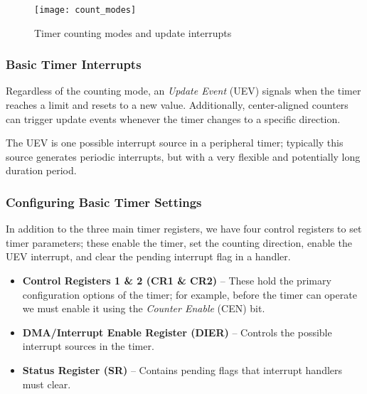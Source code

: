 \documentclass[openany,11pt,fleqn]{book} %
\begin{document}
    \begin{figure}[]
        \centering\texttt{[image: count\_modes]}
        \caption{Timer counting modes and update interrupts}
        \label{count_modes}
    \end{figure}

    \subsubsection{Basic Timer Interrupts}
    
    Regardless of the counting mode, an \textit{Update Event} (UEV) signals when the timer reaches a limit and resets to a new value. Additionally, center-aligned counters can trigger update events whenever the timer changes to a specific direction. 
    
    The UEV is one possible interrupt source in a peripheral timer; typically this source generates periodic interrupts, but with a very flexible and potentially long duration period.
    
    \subsubsection{Configuring Basic Timer Settings}
    In addition to the three main timer registers, we have four control registers to set timer parameters; these enable the timer, set the counting direction, enable the UEV interrupt, and clear the pending interrupt flag in a handler. 
    
    \begin{itemize}
        \item \textbf{Control Registers 1 \& 2 (CR1 \& CR2)} -- These hold the primary configuration options of the timer; for example, before the timer can operate we must enable it using the \textit{Counter Enable} (CEN) bit. 
        \item\textbf{DMA/Interrupt Enable Register (DIER)} -- Controls the possible interrupt sources in the timer.
        \item\textbf{Status Register (SR)} -- Contains pending flags that interrupt handlers must clear.
    \end{itemize}
\end{document}
